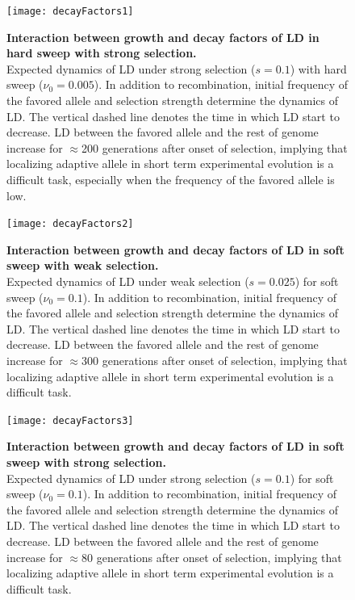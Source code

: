 {\begin{figure}[H]
	\centering
	\texttt{[image: decayFactors1]}	
\caption{{\bf Interaction between growth and decay factors of LD in 
hard 
		sweep with	strong selection.}\\
	Expected dynamics of LD under strong selection ($s=0.1$) with hard sweep 
	($\nu_0=0.005$). In addition to 
	recombination, initial frequency of the favored allele and 
	selection 
	strength determine the dynamics of LD. The vertical dashed line 
	denotes 
	the time in which LD start to decrease. LD between the favored 
	allele 
	and the rest of genome increase for 
	$\approx$200 generations after onset of selection, implying that 
	localizing adaptive allele in short 
	term experimental evolution is a difficult task, especially when 
	the 
	frequency of the favored allele is low.} \label{fig:ldf1}
\end{figure}
\begin{figure}[H]
	\centering
	\texttt{[image: decayFactors2]}	
\caption{{\bf Interaction between growth and decay factors of LD in 
soft 
		sweep with	weak selection.}\\
	Expected dynamics of LD under weak selection ($s=0.025$) for soft sweep 
	($\nu_0=0.1$).  In addition to 
	recombination, initial frequency of the favored allele and 
	selection 
	strength determine the dynamics of LD. The vertical dashed line 
	denotes 
	the time in which LD start to decrease. LD between the favored 
	allele 
	and the rest of genome increase for 
	$\approx$300 generations after onset of selection, implying that 
	localizing adaptive allele in short 
	term experimental evolution is a difficult task.} \label{fig:ldf2}
\end{figure}
\begin{figure}[H]
	\centering
	\texttt{[image: decayFactors3]}	
\caption{{\bf Interaction between growth and decay factors of LD in 
soft 
		sweep with	strong selection.}\\
	Expected dynamics of LD under strong selection ($s=0.1$) for soft sweep 
	($\nu_0=0.1$).  In addition to 
	recombination, initial frequency of the favored allele and 
	selection 
	strength determine the dynamics of LD. The vertical dashed line 
	denotes 
	the time in which LD start to decrease. LD between the favored 
	allele 
	and the rest of genome increase for 
	$\approx$80 generations after onset of selection, implying that 
	localizing adaptive allele in short 
	term experimental evolution is a difficult task.} \label{fig:ldf3}
\end{figure}
}

